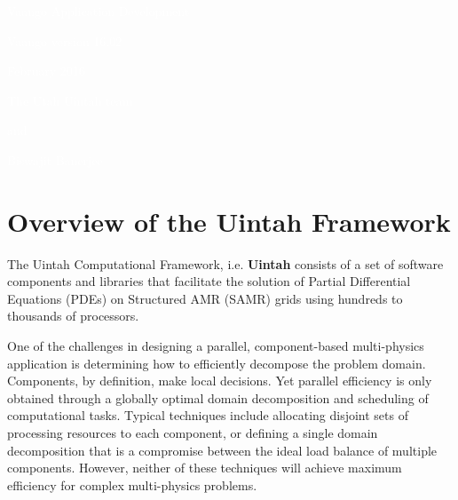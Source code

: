 \documentclass[11pt,fleqn]{book} %
\begin{document}
\begingroup
  \thispagestyle{empty}
  \AddToShipoutPicture*{\BackgroundPic} %
  \centering
  \vspace*{1cm}
  \par\normalfont\fontsize{35}{35}\sffamily\selectfont
  \textcolor{white}{Vaango Application Development}\par %
  \vspace*{0.5cm}
  {\Large \textcolor{white}{Vaango version 16.02}}\par
  {\Large \textcolor{white}{February 2016}}\par
  \vspace*{1cm}
  {\Large \textcolor{white}{The Utah Uintah team}}\par %
  {\Large \textcolor{white}{and}}\par %
  {\Large \textcolor{white}{Biswajit Banerjee}}\par %
\endgroup





\chapter{Overview of the Uintah Framework}

The Uintah Computational Framework, i.e. \textbf{Uintah} consists of a
set of software components and libraries that facilitate the solution
of Partial Differential Equations (PDEs) on Structured AMR (SAMR)
grids using hundreds to thousands of processors.

One of the challenges in designing a parallel, component-based
multi-physics application is determining how to efficiently decompose
the problem domain. Components, by definition, make local
decisions. Yet parallel efficiency is only obtained through a globally
optimal domain decomposition and scheduling of computational
tasks. Typical techniques include allocating disjoint sets of
processing resources to each component, or defining a single domain
decomposition that is a compromise between the ideal load balance of
multiple components. However, neither of these techniques will achieve
maximum efficiency for complex multi-physics problems.
\end{document}

